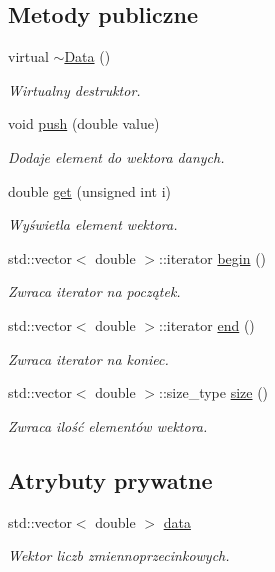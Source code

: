 \subsection*{\-Metody publiczne}
\begin{DoxyCompactItemize}
\item 
virtual \hyperlink{class_data_a8c4dbe720325cd952ec9146114f22d35}{$\sim$\-Data} ()
\begin{DoxyCompactList}\small\item\em \-Wirtualny destruktor. \end{DoxyCompactList}\item 
void \hyperlink{class_data_a642f78a648da7acf9df648cbd28b6f53}{push} (double value)
\begin{DoxyCompactList}\small\item\em \-Dodaje element do wektora danych. \end{DoxyCompactList}\item 
double \hyperlink{class_data_ad817b2f9fd143b949d0deb3ad1ba6d5d}{get} (unsigned int i)
\begin{DoxyCompactList}\small\item\em \-Wyświetla element wektora. \end{DoxyCompactList}\item 
std\-::vector$<$ double $>$\-::iterator \hyperlink{class_data_ad20496a4db65c1aebaad4217f876e19c}{begin} ()
\begin{DoxyCompactList}\small\item\em \-Zwraca iterator na początek. \end{DoxyCompactList}\item 
std\-::vector$<$ double $>$\-::iterator \hyperlink{class_data_ab51897fdf937a369d89624c564d58d6d}{end} ()
\begin{DoxyCompactList}\small\item\em \-Zwraca iterator na koniec. \end{DoxyCompactList}\item 
std\-::vector$<$ double $>$\-::size\-\_\-type \hyperlink{class_data_a8ed62af1e1f9e271e475b882a3d3ea4d}{size} ()
\begin{DoxyCompactList}\small\item\em \-Zwraca ilość elementów wektora. \end{DoxyCompactList}\end{DoxyCompactItemize}
\subsection*{\-Atrybuty prywatne}
\begin{DoxyCompactItemize}
\item 
std\-::vector$<$ double $>$ \hyperlink{class_data_a375ee0846e20237e857df59893228b68}{data}
\begin{DoxyCompactList}\small\item\em \-Wektor liczb zmiennoprzecinkowych. \end{DoxyCompactList}\end{DoxyCompactItemize}


